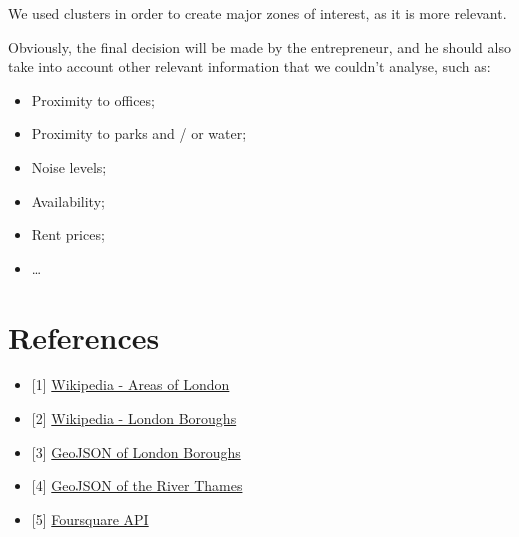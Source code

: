 \documentclass[11pt]{article}
\providecommand{\tightlist}{%
      \setlength{\itemsep}{0pt}\setlength{\parskip}{0pt}}
\begin{document}
We used clusters in order to create major zones of interest, as it is
more relevant.

Obviously, the final decision will be made by the entrepreneur, and he
should also take into account other relevant information that we
couldn't analyse, such as:
\begin{itemize}
\item
    Proximity to offices;
\item
    Proximity to parks and / or water;
\item
    Noise levels;
\item
    Availability;
\item
    Rent prices;
\item
    \ldots{}
\end{itemize}


    \hypertarget{references}{%
\section{\texorpdfstring{References
}{References }}\label{references}}

\begin{itemize}
\tightlist
\item
  {[}1{]} \href{https://en.wikipedia.org/wiki/List_of_areas_of_London}{Wikipedia - Areas of London}
\item
  {[}2{]} \href{https://en.wikipedia.org/wiki/List_of_London_boroughs}{Wikipedia - London Boroughs}
\item
  {[}3{]} \href{https://skgrange.github.io/www/data/london_boroughs.json}{GeoJSON of London Boroughs}
\item
  {[}4{]} \href{https://jburnford.carto.com/tables/thames/public}{GeoJSON of the River Thames}
\item
  {[}5{]} \href{https://developer.foursquare.com/}{Foursquare API}
\end{itemize}


    
    
    
\end{document}
